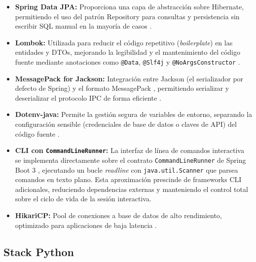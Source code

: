 \begin{itemize}
    \item \textbf{Spring Data JPA:} Proporciona una capa de abstracción sobre 
    Hibernate, permitiendo el uso del patrón Repository \parencite{gamma_design_1994} 
    para consultas y persistencia sin escribir SQL manual en la mayoría de casos 
    \parencite{spring_data_jpa_2024}.

    \item \textbf{Lombok:} Utilizada para reducir el código repetitivo 
    (\textit{boilerplate}) en las entidades y DTOs, mejorando la legibilidad y 
    el mantenimiento del código fuente mediante anotaciones como \texttt{@Data}, 
    \texttt{@Slf4j} y \texttt{@NoArgsConstructor} \parencite{richards_software_2022,lombok_project_2024}.

    \item \textbf{MessagePack for Jackson:} Integración entre Jackson (el 
    serializador por defecto de Spring) y el formato MessagePack 
    \parencite{furuhashi_msgpack_2013}, permitiendo serializar y deserializar 
    el protocolo IPC de forma eficiente \parencite{pivotal_springboot_2024}.

    \item \textbf{Dotenv-java:} Permite la gestión segura de variables de 
    entorno, separando la configuración sensible (credenciales de base de datos 
    o claves de API) del código fuente \parencite{owasp_password_2024}.

    \item \textbf{CLI con \texttt{CommandLineRunner}:} La interfaz de línea de
    comandos interactiva se implementa directamente sobre el contrato
    \texttt{CommandLineRunner} de Spring Boot 3 \parencite{pivotal_springboot_2024},
    ejecutando un bucle \textit{readline} con \texttt{java.util.Scanner} que
    parsea comandos en texto plano. Esta aproximación prescinde de frameworks
    CLI adicionales, reduciendo dependencias externas y manteniendo el control
    total sobre el ciclo de vida de la sesión interactiva.

    \item \textbf{HikariCP:} Pool de conexiones a base de datos de alto 
    rendimiento, optimizado para aplicaciones de baja latencia 
    \parencite{wooldridge_hikaricp_2024}.
\end{itemize}

\subsection{Stack Python}

